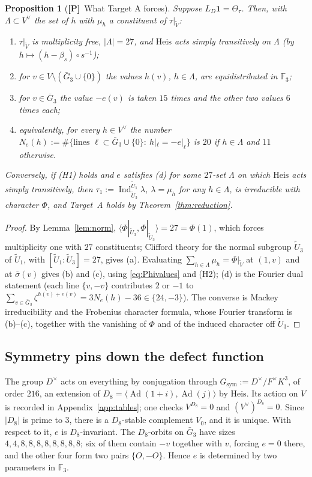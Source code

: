\documentclass[11pt]{article}
\newcommand{\Fq}{\mathbb F}
\newcommand{\Ind}{\operatorname{Ind}}
\newcommand{\Ad}{\operatorname{Ad}}
\newcommand{\tU}{\widetilde U}
\newcommand{\tV}{\widetilde V}
\newcommand{\Heis}{\mathrm{Heis}}
\newcommand{\Ptag}{\textnormal{\textbf{[P]}}}
\theoremstyle{plain}
\newtheorem{proposition}[theorem]{Proposition}
\theoremstyle{definition}
\begin{document}
\begin{proposition}[\Ptag\ What Target A forces]\label{prop:forces}
Suppose $L_D\mathbf1=\Theta_\tau$.  Then, with $\Lambda\subset V^\vee$ the
set of $h$ with $\mu_h$ a constituent of $\tau|_{\tV}$:
\begin{enumerate}[label=(\alph*)]
\item $\tau|_{\tV}$ is multiplicity free, $|\Lambda|=27$, and $\Heis$ acts
simply transitively on $\Lambda$ (by $h\mapsto(h-\beta_s)\circ s^{-1}$);
\item for $v\in V\setminus(\bar G_3\cup\{0\})$ the values $h(v)$, $h\in\Lambda$,
are equidistributed in $\Fq_3$;
\item for $v\in\bar G_3$ the value $-e(v)$ is taken $15$ times and the
other two values $6$ times each;
\item equivalently, for every $h\in V^\vee$ the number
$N_e(h):=\#\{\text{lines }\ell\subset\bar G_3\cup\{0\}:\ h|_\ell=-e|_\ell\}$
is $20$ if $h\in\Lambda$ and $11$ otherwise.
\end{enumerate}
Conversely, if (H1) holds and $e$ satisfies (d) for some $27$-set
$\Lambda$ on which $\Heis$ acts simply transitively, then
$\tau_1:=\Ind_{\tU_3}^{\tU_1}\lambda$, $\lambda=\mu_h$ for any $h\in\Lambda$,
is irreducible with character $\Phi$, and Target~A holds by
Theorem~\ref{thm:reduction}.
\end{proposition}
\begin{proof}
By Lemma~\ref{lem:norm}, $\langle\Phi|_{\tU_3},\Phi|_{\tU_3}\rangle=27=\Phi(1)$,
which forces multiplicity one with $27$ constituents; Clifford theory
for the normal subgroup $\tU_3$ of $\tU_1$, with $[\tU_1:\tU_3]=27$,
gives (a).  Evaluating $\sum_{h\in\Lambda}\mu_h=\Phi|_{\tV}$ at
$(1,v)$ and at $\bar\sigma(v)$ gives (b) and (c), using
\eqref{eq:Phivalues} and (H2); (d) is the Fourier dual statement
(each line $\{v,-v\}$ contributes $2$ or $-1$ to
$\sum_{v\in\bar G_3}\zeta^{h(v)+e(v)}=3N_e(h)-36\in\{24,-3\}$).  The
converse is Mackey irreducibility and the Frobenius character formula,
whose Fourier transform is (b)--(c), together with the vanishing of
$\Phi$ and of the induced character off $\tU_3$.
\end{proof}

\subsection{Symmetry pins down the defect function}
The group $D^\times$ acts on everything by conjugation through
$G_{\mathrm{sym}}:=D^\times/F^\times K^3$, of order $216$, an extension of
$D_8=\langle\Ad(1+i),\Ad(j)\rangle$ by $\Heis$.  Its action on $V$ is
recorded in Appendix~\ref{app:tables}; one checks $V^{D_8}=0$ and
$(V^\vee)^{D_8}=0$.  Since $|D_8|$ is prime to $3$, there is a
$D_8$-stable complement $V_0$, and it is unique.  With respect to it,
$e$ is $D_8$-invariant.  The $D_8$-orbits on $\bar G_3$ have sizes
$4,4,8,8,8,8,8,8,8,8$; six of them contain $-v$ together with $v$,
forcing $e=0$ there, and the other four form two pairs $\{O,-O\}$.
Hence $e$ is determined by two parameters in $\Fq_3$.
\end{document}
